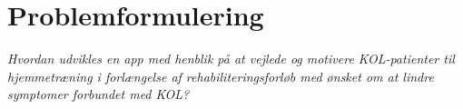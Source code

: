 \section{Problemformulering}
\textit{Hvordan udvikles en app med henblik på at vejlede og motivere KOL-patienter til hjemmetræning i forlængelse af rehabiliteringsforløb med ønsket om at lindre symptomer forbundet med KOL? }